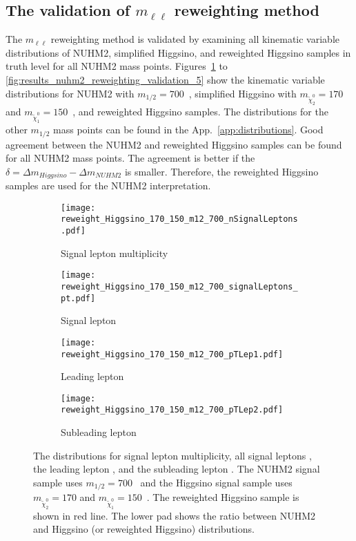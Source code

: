 \subsection{The validation of $m_{\ell \ell}$ reweighting method}
\label{subsec:results_reweighted_validations}
The $m_{\ell \ell}$ reweighting method is validated by examining all kinematic variable distributions of NUHM2, simplified Higgsino, and reweighted Higgsino samples in truth level for all NUHM2 mass points.
Figures~\ref{fig:results_nuhm2_reweighting_validation_1} to \ref{fig:results_nuhm2_reweighting_validation_5} show the kinematic variable distributions for NUHM2 with $m_{1/2} = 700$~{\GeV}, simplified Higgsino with $m_{\widetilde{\chi}^{0}_{2}} = 170$ and $m_{\widetilde{\chi}^{0}_{1}} = 150$~{\GeV}, and reweighted Higgsino samples.
The distributions for the other $m_{1/2}$ mass points can be found in the App.~\ref{app:distributions}.
Good agreement between the NUHM2 and reweighted Higgsino samples can be found for all NUHM2 mass points.
The agreement is better if the $\delta = \Delta m_{Higgsino} - \Delta m_{NUHM2}$ is smaller.
Therefore, the reweighted Higgsino samples are used for the NUHM2 interpretation.

\begin{figure}[htbp]
    \begin{center}
        \begin{subfigure}[b]{0.48\textwidth}
            \texttt{[image: reweight\_Higgsino\_170\_150\_m12\_700\_nSignalLeptons.pdf]}
            \caption{Signal lepton multiplicity}
        \end{subfigure}
        \begin{subfigure}[b]{0.48\textwidth}
            \texttt{[image: reweight\_Higgsino\_170\_150\_m12\_700\_signalLeptons\_pt.pdf]}
            \caption{Signal lepton \pt}
        \end{subfigure}
        \begin{subfigure}[b]{0.48\textwidth}
            \texttt{[image: reweight\_Higgsino\_170\_150\_m12\_700\_pTLep1.pdf]}
            \caption{Leading lepton \pt}
        \end{subfigure}
        \begin{subfigure}[b]{0.48\textwidth}
            \texttt{[image: reweight\_Higgsino\_170\_150\_m12\_700\_pTLep2.pdf]}
            \caption{Subleading lepton \pt}
        \end{subfigure}
    \end{center}
    \caption{The distributions for signal lepton multiplicity, all signal leptons \pt, the leading lepton \pt, and the subleading lepton \pt.
    The NUHM2 signal sample uses  $m_{1/2} = 700$~{\GeV} and the Higgsino signal sample uses $m_{\widetilde{\chi}^{0}_{2}} = 170$ and $m_{\widetilde{\chi}^{0}_{1}} = 150$~{\GeV}.
    The reweighted Higgsino sample is shown in red line.
    The lower pad shows the ratio between NUHM2 and Higgsino (or reweighted Higgsino) distributions.}
    \label{fig:results_nuhm2_reweighting_validation_1}
\end{figure}

